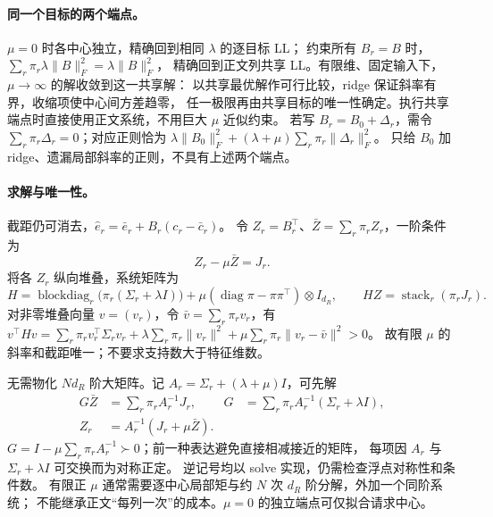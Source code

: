 \documentclass[11pt,UTF8,fontset=fandol]{ctexart}
\numberwithin{equation}{section}
\theoremstyle{definition}
\begin{document}
\paragraph{同一个目标的两个端点。}
$\mu=0$ 时各中心独立，精确回到相同 $\lambda$ 的逐目标 LL；
约束所有 $B_r=B$ 时，$\sum_r\pi_r\lambda\|B\|_F^2=\lambda\|B\|_F^2$，
精确回到正文列共享 LL。有限维、固定输入下，$\mu\to\infty$ 的解收敛到这一共享解：
以共享最优解作可行比较，ridge 保证斜率有界，收缩项使中心间方差趋零，
任一极限再由共享目标的唯一性确定。执行共享端点时直接使用正文系统，不用巨大 $\mu$ 近似约束。
若写 $B_r=B_0+\Delta_r$，需令 $\sum_r\pi_r\Delta_r=0$；对应正则恰为
$\lambda\|B_0\|_F^2+(\lambda+\mu)\sum_r\pi_r\|\Delta_r\|_F^2$。
只给 $B_0$ 加 ridge、遗漏局部斜率的正则，不具有上述两个端点。

\paragraph{求解与唯一性。}
截距仍可消去，$\widehat e_r=\bar e_r+B_r(c_r-\bar c_r)$。
令 $Z_r=B_r^\top$、$\bar Z=\sum_r\pi_rZ_r$，一阶条件为
\begin{equation}
 [\Sigma_r+(\lambda+\mu)I]Z_r-\mu\bar Z=J_r.
 \label{v53g:eq:shrinkage-normal}
\end{equation}
将各 $Z_r$ 纵向堆叠，系统矩阵为
\begin{equation}
 H=\operatorname{blockdiag}_r\!\bigl(\pi_r(\Sigma_r+\lambda I)\bigr)
   +\mu(\operatorname{diag}\pi-\pi\pi^\top)\otimes I_{d_R},\qquad
 HZ=\operatorname{stack}_r(\pi_rJ_r).
 \label{v53g:eq:shrinkage-spd}
\end{equation}
对非零堆叠向量 $v=(v_r)$，令 $\bar v=\sum_r\pi_rv_r$，有
$v^\top Hv=\sum_r\pi_rv_r^\top\Sigma_rv_r+
\lambda\sum_r\pi_r\|v_r\|^2+\mu\sum_r\pi_r\|v_r-\bar v\|^2>0$。
故有限 $\mu$ 的斜率和截距唯一；不要求支持数大于特征维数。

无需物化 $Nd_R$ 阶大矩阵。记 $A_r=\Sigma_r+(\lambda+\mu)I$，可先解
\begin{equation}
 \begin{aligned}
 G\bar Z&=\sum_r\pi_r A_r^{-1}J_r,&
 G&=\sum_r\pi_r A_r^{-1}(\Sigma_r+\lambda I),\\
 Z_r&=A_r^{-1}(J_r+\mu\bar Z).&&
 \end{aligned}
 \label{v53g:eq:shrinkage-elimination}
\end{equation}
$G=I-\mu\sum_r\pi_rA_r^{-1}\succ0$；前一种表达避免直接相减接近的矩阵，
每项因 $A_r$ 与 $\Sigma_r+\lambda I$ 可交换而为对称正定。
逆记号均以 solve 实现，仍需检查浮点对称性和条件数。
有限正 $\mu$ 通常需要逐中心局部矩与约 $N$ 次 $d_R$ 阶分解，外加一个同阶系统；
不能继承正文“每列一次”的成本。$\mu=0$ 的独立端点可仅拟合请求中心。
\end{document}
